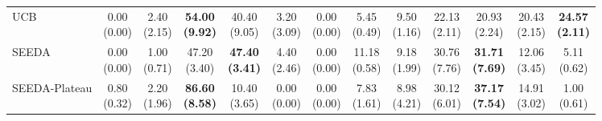 {\begin{tabular}{l|cccccc|cccccc}
UCB & \makecell{0.00 \\ (0.00)} & \makecell{2.40 \\ (2.15)} & {\cellcolor[HTML]{C8E6C9}} \bfseries \makecell{54.00 \\ (9.92)} & \makecell{40.40 \\ (9.05)} & \makecell{3.20 \\ (3.09)} & \makecell{0.00 \\ (0.00)} & \makecell{5.45 \\ (0.49)} & \makecell{9.50 \\ (1.16)} & {\cellcolor[HTML]{C8E6C9}} \makecell{22.13 \\ (2.11)} & \makecell{20.93 \\ (2.24)} & \makecell{20.43 \\ (2.15)} & \bfseries \makecell{24.57 \\ (2.11)} \\
SEEDA & \makecell{0.00 \\ (0.00)} & \makecell{1.00 \\ (0.71)} & {\cellcolor[HTML]{C8E6C9}} \makecell{47.20 \\ (3.40)} & \bfseries \makecell{47.40 \\ (3.41)} & \makecell{4.40 \\ (2.46)} & \makecell{0.00 \\ (0.00)} & \makecell{11.18 \\ (0.58)} & \makecell{9.18 \\ (1.99)} & {\cellcolor[HTML]{C8E6C9}} \makecell{30.76 \\ (7.76)} & \bfseries \makecell{31.71 \\ (7.69)} & \makecell{12.06 \\ (3.45)} & \makecell{5.11 \\ (0.62)} \\
SEEDA-Plateau & \makecell{0.80 \\ (0.32)} & \makecell{2.20 \\ (1.96)} & {\cellcolor[HTML]{C8E6C9}} \bfseries \makecell{86.60 \\ (8.58)} & \makecell{10.40 \\ (3.65)} & \makecell{0.00 \\ (0.00)} & \makecell{0.00 \\ (0.00)} & \makecell{7.83 \\ (1.61)} & \makecell{8.98 \\ (4.21)} & {\cellcolor[HTML]{C8E6C9}} \makecell{30.12 \\ (6.01)} & \bfseries \makecell{37.17 \\ (7.54)} & \makecell{14.91 \\ (3.02)} & \makecell{1.00 \\ (0.61)} \\
\bottomrule
\end{tabular}
}%
